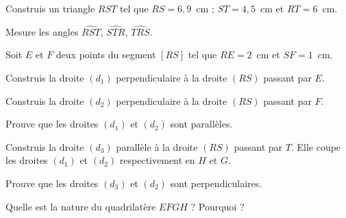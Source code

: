 \begin{myenumerate}
\item Construis un triangle $RST$ tel que $RS=6,9$~cm ; $ST=4,5$~cm
et $RT=6$~cm.
\item Mesure les angles $\widehat{RST}$, $\widehat{STR}$,
$\widehat{TRS}$.
\item Soit $E$ et $F$ deux points du segment $[RS]$ tel que $RE=2$~cm
et $SF=1$~cm.
\item Construis la droite $(d_1)$ perpendiculaire à la droite $(RS)$
passant par $E$.
\item Construis la droite $(d_2)$ perpendiculaire à la droite $(RS)$
passant par $F$.
\item Prouve que les droites $(d_1)$ et $(d_2)$ sont parallèles.
\item Construis la droite $(d_3)$ parallèle à la droite $(RS)$ passant
par $T$. Elle coupe les droites $(d_1)$ et $(d_2)$ respectivement en
$H$ et $G$.
\item Prouve que les droites $(d_3)$ et $(d_2)$ sont perpendiculaires.
\item Quelle est la nature du quadrilatère $EFGH$ ? Pourquoi ?
\end{myenumerate}